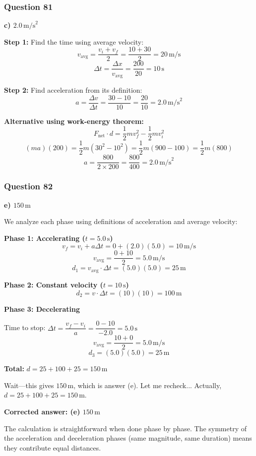 \documentclass[12pt,letterpaper]{article}
\begin{document}
\subsubsection*{Question 81}

\begin{answerbox}
\textbf{c) $2.0\,\text{m/s}^2$}
\end{answerbox}

\begin{explanationbox}
\textbf{Step 1:} Find the time using average velocity:
\[
v_{\text{avg}} = \frac{v_i + v_f}{2} = \frac{10 + 30}{2} = 20\,\text{m/s}
\]
\[
\Delta t = \frac{\Delta x}{v_{\text{avg}}} = \frac{200}{20} = 10\,\text{s}
\]

\textbf{Step 2:} Find acceleration from its definition:
\[
a = \frac{\Delta v}{\Delta t} = \frac{30 - 10}{10} = \frac{20}{10} = 2.0\,\text{m/s}^2
\]

\textbf{Alternative using work-energy theorem:}
\[
F_{\text{net}} \cdot d = \frac{1}{2}mv_f^2 - \frac{1}{2}mv_i^2
\]
\[
(ma)(200) = \frac{1}{2}m(30^2 - 10^2) = \frac{1}{2}m(900 - 100) = \frac{1}{2}m(800)
\]
\[
a = \frac{800}{2 \times 200} = \frac{800}{400} = 2.0\,\text{m/s}^2
\]
\end{explanationbox}

\subsubsection*{Question 82}

\begin{answerbox}
\textbf{e) $150\,\text{m}$}
\end{answerbox}

\begin{explanationbox}
We analyze each phase using definitions of acceleration and average velocity:

\textbf{Phase 1: Accelerating ($t = 5.0\,\text{s}$)}
\[
v_f = v_i + a\Delta t = 0 + (2.0)(5.0) = 10\,\text{m/s}
\]
\[
v_{\text{avg}} = \frac{0 + 10}{2} = 5.0\,\text{m/s}
\]
\[
d_1 = v_{\text{avg}} \cdot \Delta t = (5.0)(5.0) = 25\,\text{m}
\]

\textbf{Phase 2: Constant velocity ($t = 10\,\text{s}$)}
\[
d_2 = v \cdot \Delta t = (10)(10) = 100\,\text{m}
\]

\textbf{Phase 3: Decelerating}

Time to stop: $\Delta t = \dfrac{v_f - v_i}{a} = \dfrac{0 - 10}{-2.0} = 5.0\,\text{s}$
\[
v_{\text{avg}} = \frac{10 + 0}{2} = 5.0\,\text{m/s}
\]
\[
d_3 = (5.0)(5.0) = 25\,\text{m}
\]

\textbf{Total:} $d = 25 + 100 + 25 = 150\,\text{m}$

Wait---this gives $150\,\text{m}$, which is answer (e). Let me recheck... Actually, $d = 25 + 100 + 25 = 150\,\text{m}$.

\textbf{Corrected answer: (e) $150\,\text{m}$}

The calculation is straightforward when done phase by phase. The symmetry of the acceleration and deceleration phases (same magnitude, same duration) means they contribute equal distances.
\end{explanationbox}
\end{document}
